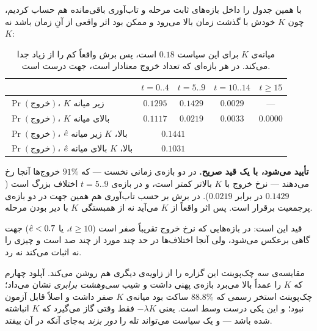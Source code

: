 \documentclass[12pt,a4paper]{article}
\begin{document}
با  همین جدول را داخل بازه‌های ثابت مرحله و
تاب‌آوری باقی‌مانده هم حساب کردیم، چون $K$ خودش با گذشت زمان بالا می‌رود و
ممکن بود اثر واقعی از آنِ زمان باشد نه $K$:

\begin{table}[h]\centering\small
\begin{tabular}{lcccc}
\toprule
 & $t=0..4$ & $t=5..9$ & $t=10..14$ & $t\ge15$\\
\midrule
$\Pr(\text{خروج})$، $K$ زیر میانه   & $0.1295$ & $0.1429$ & $0.0029$ & ---\\
$\Pr(\text{خروج})$، $K$ بالای میانه & $\mathbf{0.1117}$ & $\mathbf{0.0219}$ & $0.0033$ & $0.0000$\\
\midrule
$\Pr(\text{خروج})$، $\hat{e}$ بالا، $K$ زیر میانه   & \multicolumn{2}{c}{$0.1441$} & & \\
$\Pr(\text{خروج})$، $\hat{e}$ بالا، $K$ بالای میانه & \multicolumn{2}{c}{$\mathbf{0.1031}$} & & \\
\bottomrule
\end{tabular}
\caption{میانه‌ی $K$ برای این سیاست $0.18$ است، پس برش واقعاً کم را از
زیاد جدا می‌کند. در هر بازه‌ای که تعداد خروج معنادار است، جهت درست است.}
\end{table}

\begin{answer}
\textbf{تأیید می‌شود، با یک قید صریح.} در دو بازه‌ی زمانی نخست — که
$91\%$ خروج‌ها آنجا رخ می‌دهند — نرخ خروج با $K$ بالاتر کمتر است، و در
بازه‌ی $t=5..9$ اختلاف بزرگ است ($0.1429$ در برابر $0.0219$). در برش بر
حسب تاب‌آوری هم همین جهت در دو بازه‌ی پرجمعیت برقرار است. پس اثر واقعاً
از $K$ می‌آید نه از همبستگی $K$ با دیر بودن مرحله.

قید این است: در بازه‌هایی که نرخ خروج تقریباً صفر است
($t\ge10$، یا $\hat{e}<0.7$) جهت گاهی برعکس می‌شود، ولی آنجا اختلاف‌ها در
حد چند مورد از چند صد است و چیزی را نه اثبات می‌کند نه رد.

مقایسه‌ی سه چک‌پوینت این گزاره را از زاویه‌ی دیگری هم روشن می‌کند.
آپلود چهارم که $K$ را عمداً بالا می‌برد بازه‌ی پهنی داشت و شیب
\emph{سی‌وهشت برابری} نشان می‌داد؛ چک‌پوینت استخر رسمی که $88.8\%$ ساکت
بود میانه‌ی $K$ صفر داشت و اصلاً قابل آزمون نبود؛ و این یکی درست وسط
است. یعنی $-\lambda K$ فقط وقتی گاز می‌گیرد که $K$ انباشته شده باشد —
و یک سیاست می‌تواند تله را \emph{دور بزند} به‌جای آنکه در آن بیفتد.
\end{answer}
\end{document}
